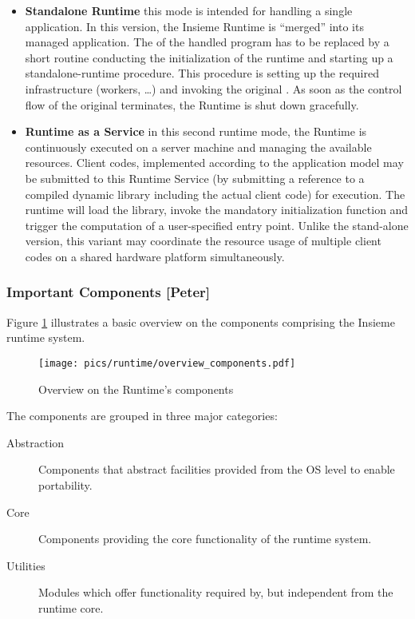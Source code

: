 \begin{itemize}
  \item \textbf{Standalone Runtime} this mode is
  intended for handling a single application. In this version, the Insieme
  Runtime is ``merged'' into its managed application. The  of
  the handled program has to be replaced by a short routine conducting the
  initialization of the runtime and starting up a standalone-runtime procedure.
  This procedure is setting up the required infrastructure (workers, \ldots) and
  invoking the original . As soon as the control flow of the
  original  terminates, the Runtime is shut down gracefully.
   
  \item \textbf{Runtime as a Service}
  in this second runtime mode, the Runtime is continuously executed on a server
  machine and managing the available resources. Client codes, implemented
  according to the application model may be submitted to this Runtime Service
  (by submitting a reference to a compiled dynamic library including the actual
  client code) for execution. The runtime will load the library, invoke the
  mandatory initialization function and trigger the computation of a
  user-specified entry point. Unlike the stand-alone version, this variant may
  coordinate the resource usage of multiple client codes on a shared hardware
  platform simultaneously.
\end{itemize} 

\subsubsection{Important Components [Peter]} \label{sec:overview:runtime:components}
Figure \ref{fig:Overview.Runtime.Components} illustrates a basic overview on
the components comprising the Insieme runtime system. 
\begin{figure}[tb]
	\centering
	\texttt{[image: pics/runtime/overview\_components.pdf]}
	\caption{Overview on the Runtime's components}
	\label{fig:Overview.Runtime.Components}
\end{figure}

The components are grouped in three major categories:
\begin{description}
  \item[Abstraction] Components that abstract facilities provided from the OS level to enable portability.
  \item[Core] Components providing the core functionality of the runtime system.
  \item[Utilities] Modules which offer functionality required by, but independent from the runtime core.
\end{description}

